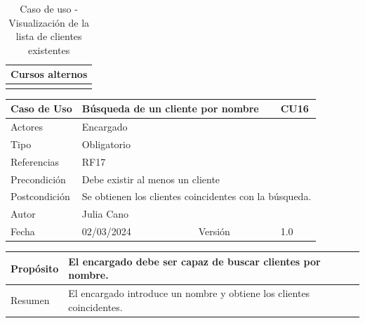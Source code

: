 \begin{table}[H]
	\centering
	\begin{tabular}{| m{} | m{} | m{} | m{} |}
		\hline
		\multicolumn{4}{|m{0.9\textwidth}|}{Cursos alternos}     \\ 
		\hline
		& \multicolumn{3}{m{0.67\textwidth}|}{} \\ 
		\hline
	\end{tabular}
	\caption{Caso de uso - Visualización de la lista de clientes existentes}
\end{table}

\newpage


\begin{table}[H]
	\centering
	\begin{tabular}{| m{} | m{} | m{} | m{}|}
		\hline
		\rowcolor{grayshade} Caso de Uso & \multicolumn{2}{|m{0.43\textwidth}|}{Búsqueda de un cliente por nombre} &  CU16\\ 
		\hline
		Actores & \multicolumn{3}{l|}{Encargado} \\ 
		\hline
		Tipo & \multicolumn{3}{l|}{Obligatorio} \\ 
		\hline
		Referencias & \multicolumn{3}{l|}{RF17} \\ 
		\hline
		Precondición & \multicolumn{3}{m{0.67\textwidth}|}{Debe existir al menos un cliente} \\ 
		\hline
		Postcondición & \multicolumn{3}{m{0.67\textwidth}|}{Se obtienen los clientes coincidentes con la búsqueda.} \\ 
		\hline
		Autor & \multicolumn{3}{l|}{Julia Cano} \\ 
		\hline
		Fecha & 02/03/2024 & Versión & 1.0 \\
		\hline
	\end{tabular}
\end{table}

\begin{table}[H]
	\centering
	\begin{tabular}{| m{} | m{} | m{} | m{} |}
		\hline
		Propósito & \multicolumn{3}{m{0.67\textwidth}|}{El encargado debe ser capaz de buscar clientes por nombre.}  \\ 
		\hline
		Resumen & \multicolumn{3}{m{0.67\textwidth}|}{El encargado introduce un nombre y obtiene los clientes coincidentes.} \\ 
		\hline
	\end{tabular}
\end{table}


